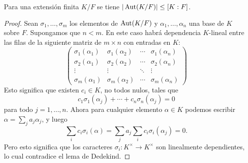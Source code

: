 \begin{proposicion}
  \label{prop:Aut(K/F)-le-K:F}
  Para una extensión finita $K/F$ se tiene $|\operatorname{Aut} (K/F)| \le [K : F]$.

  \begin{proof}
    Sean $\sigma_1, \ldots, \sigma_m$ los elementos de $\operatorname{Aut} (K/F)$ y
    $\alpha_1, \ldots, \alpha_n$ una base de $K$ sobre $F$. Supongamos que
    $n < m$. En este caso habrá dependencia $K$-lineal entre las filas de
    la siguiente matriz de $m\times n$ con entradas en $K$:
    \[ \begin{pmatrix}
      \sigma_1 (\alpha_1) & \sigma_1 (\alpha_2) & \cdots & \sigma_1 (\alpha_n) \\
      \sigma_2 (\alpha_1) & \sigma_2 (\alpha_2) & \cdots & \sigma_2 (\alpha_n) \\
      \vdots & \vdots & \ddots & \vdots \\
      \sigma_m (\alpha_1) & \sigma_m (\alpha_2) & \cdots & \sigma_m (\alpha_n)
    \end{pmatrix} \]
    Esto significa que existen $c_i \in K$, no todos nulos, tales que
    $$c_1 \sigma_1 (\alpha_j) + \cdots + c_n \sigma_n (\alpha_j) = 0$$
    para todo $j = 1,\ldots,n$. Ahora para cualquier elemento $\alpha \in K$
    podemos escribir $\alpha = \sum_j a_j \alpha_j$, y luego
    $$\sum_i c_i \sigma_i (\alpha) = \sum_j a_j \sum_i c_i \sigma_i (\alpha_j) = 0.$$
    Pero esto significa que los caracteres $\sigma_i\colon K^\times \to K^\times$
    son linealmente dependientes, lo cual contradice el lema de Dedekind.
  \end{proof}
\end{proposicion}

